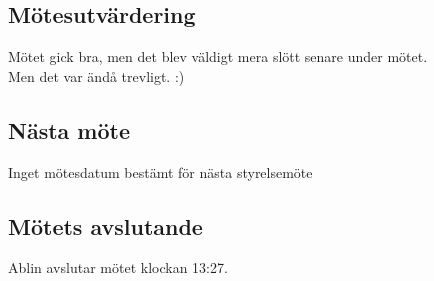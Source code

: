 \documentclass[protokoll]{dvd}
\begin{document}

    \subsection{Mötesutvärdering}
    Mötet gick bra, men det blev väldigt mera slött senare under mötet.\\
    Men det var ändå trevligt. :)

    \subsection{Nästa möte}
    Inget mötesdatum bestämt för nästa styrelsemöte

    \subsection{Mötets avslutande}
    Ablin avslutar mötet klockan 13:27.

\styrelsesignaturer
\end{document}
